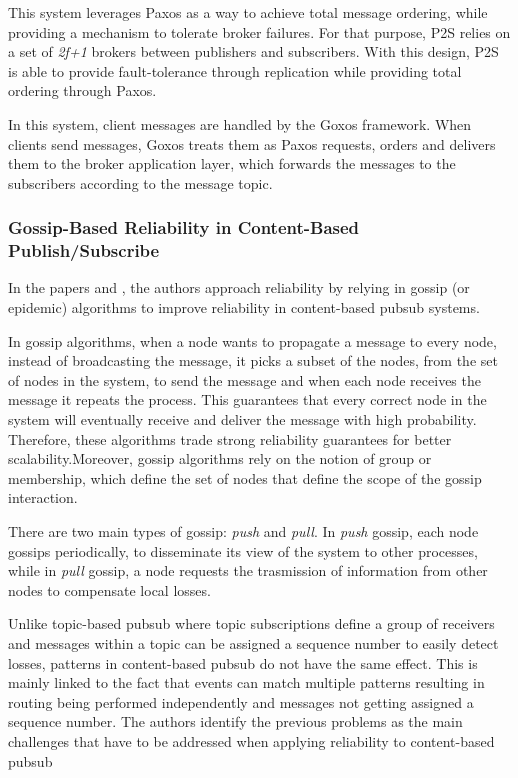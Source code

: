 This system leverages Paxos as a way to achieve total message ordering, while providing a mechanism to tolerate broker failures. For that purpose, P2S relies on a set of \textit{2f+1} brokers between publishers and subscribers. With this design, P2S is able to provide fault-tolerance through replication while providing total ordering through Paxos.

In this system, client messages are handled by the Goxos framework. When clients send messages, Goxos treats them as Paxos requests, orders and delivers them to the broker application layer, which forwards the messages to the subscribers according to the message topic.

\subsubsection{Gossip-Based Reliability in Content-Based Publish/Subscribe}

In the papers \cite{intro-epidemic-algs-for-pubsub} and \cite{epidemic-algs-for-pubsub}, the authors approach reliability by relying in gossip (or epidemic) algorithms to improve reliability in content-based \gls{pubsub} systems.

In gossip algorithms, when a node wants to propagate a message to every node, instead of broadcasting the message, it picks a subset of the nodes, from the set of nodes in the system, to send the message and when each node receives the message it repeats the process. This guarantees that every correct node in the system will eventually receive and deliver the message with high probability. Therefore, these algorithms trade strong reliability guarantees for better scalability.Moreover, gossip algorithms rely on the notion of group or membership, which define the set of nodes that define the scope of the gossip interaction.

There are two main types of gossip: \textit{push} and \textit{pull}. In \textit{push} gossip, each node gossips periodically, to disseminate its view of the system to other processes, while in \textit{pull} gossip, a node requests the trasmission of information from other nodes to compensate local losses.

Unlike topic-based \gls{pubsub} where topic subscriptions define a group of receivers and messages within a topic can be assigned a sequence number to easily detect losses, patterns in content-based \gls{pubsub} do not have the same effect. This is mainly linked to the fact that events can match multiple patterns resulting in routing being performed independently and messages not getting assigned a sequence number. The authors identify the previous problems as the main challenges that have to be addressed when applying reliability to content-based \gls{pubsub}


